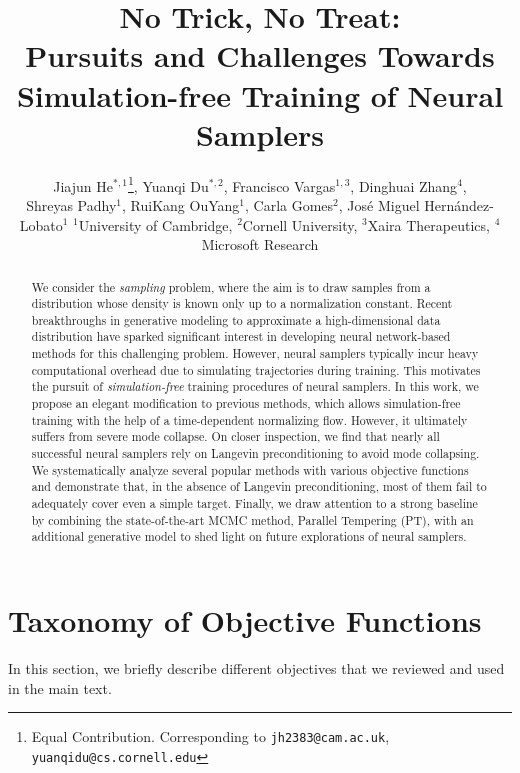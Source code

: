 \documentclass{article} %
\title{No Trick, No Treat: \\Pursuits and Challenges Towards \\Simulation-free Training of Neural Samplers}
\author{Jiajun He$^{*, 1}$\thanks{Equal Contribution. Corresponding to \texttt{jh2383@cam.ac.uk}, \texttt{yuanqidu@cs.cornell.edu}},
Yuanqi Du$^{*, 2}$,
Francisco Vargas$^{1,3}$,
Dinghuai Zhang$^{4}$, \\
\AND
Shreyas Padhy$^{1}$,
RuiKang OuYang$^{1}$,
Carla Gomes$^{2}$,
José Miguel Hernández-Lobato$^{1}$
\Note $^1$University of Cambridge, $^2$Cornell University, $^3$Xaira Therapeutics, $^4$Microsoft Research
}
\begin{document}
\maketitle

\begin{abstract}
We consider the \textit{sampling} problem, where the aim is to draw samples from a distribution whose density is known only up to a normalization constant. 
Recent breakthroughs in generative modeling to approximate a high-dimensional data distribution have sparked significant interest in developing neural network-based methods for this challenging problem. 
However, neural samplers typically incur heavy computational overhead due to simulating trajectories during training. 
This motivates the pursuit of \textit{simulation-free} training procedures of neural samplers. 
In this work, we propose an elegant modification to previous methods, which allows simulation-free training with the help of a time-dependent normalizing flow. 
However, it ultimately suffers from severe mode collapse. 
On closer inspection, we find that nearly all successful neural samplers rely on Langevin preconditioning to avoid mode collapsing. 
We systematically analyze several popular methods with various objective functions and demonstrate that, in the absence of  Langevin preconditioning, most of them fail to adequately cover even a simple target. 
Finally, we draw attention to a strong baseline by combining the state-of-the-art MCMC method, Parallel Tempering (PT), with an additional generative model to shed light on future explorations of neural samplers.
\end{abstract}









\newpage



\newpage
\appendix



\section{Taxonomy of Objective Functions}

In this section, we briefly describe different objectives that we reviewed and used in the main text.
\end{document}
